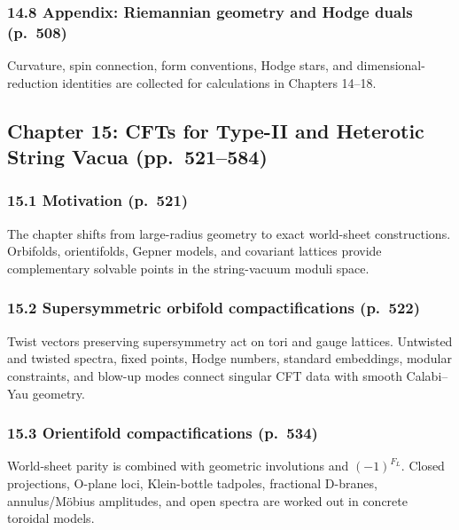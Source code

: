 \documentclass[
  10pt,
  a4paper,
  openany]{book}
\begin{document}
\subsubsection{14.8 Appendix: Riemannian geometry and Hodge duals
(p.~508)}\label{appendix-riemannian-geometry-and-hodge-duals-p.-508}

Curvature, spin connection, form conventions, Hodge stars, and
dimensional-reduction identities are collected for calculations in
Chapters 14--18.

\subsection{Chapter 15: CFTs for Type-II and Heterotic String Vacua
(pp.~521--584)}\label{chapter-15-cfts-for-type-ii-and-heterotic-string-vacua-pp.-521584}

\subsubsection{15.1 Motivation (p.~521)}\label{motivation-p.-521}

The chapter shifts from large-radius geometry to exact world-sheet
constructions. Orbifolds, orientifolds, Gepner models, and covariant
lattices provide complementary solvable points in the string-vacuum
moduli space.

\subsubsection{15.2 Supersymmetric orbifold compactifications
(p.~522)}\label{supersymmetric-orbifold-compactifications-p.-522}

Twist vectors preserving supersymmetry act on tori and gauge lattices.
Untwisted and twisted spectra, fixed points, Hodge numbers, standard
embeddings, modular constraints, and blow-up modes connect singular CFT
data with smooth Calabi--Yau geometry.

\subsubsection{15.3 Orientifold compactifications
(p.~534)}\label{orientifold-compactifications-p.-534}

World-sheet parity is combined with geometric involutions and
\((-1)^{F_L}\). Closed projections, O-plane loci, Klein-bottle tadpoles,
fractional D-branes, annulus/Möbius amplitudes, and open spectra are
worked out in concrete toroidal models.
\end{document}
